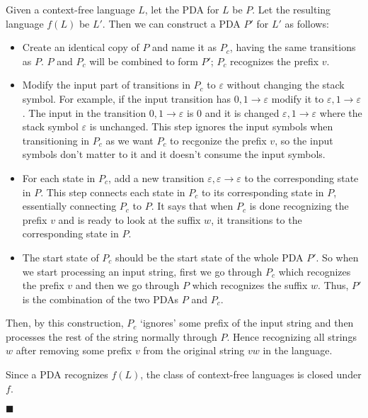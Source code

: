 \documentclass[a4paper]{exam}
\begin{document}
\begin{questions}
\begin{solution}

    Given a context-free language $L$, let the PDA for $L$ be $P$.
    Let the resulting language $f(L)$ be $L'$. Then we can construct a PDA $P'$ for $L'$ as follows: \vspace*{-2mm}
    \begin{itemize}
      \item Create an identical copy of $P$ and name it as $P_c$, having the same transitions as $P$. $P$ and $P_c$ will be combined to form $P'$; $P_c$ recognizes the prefix $v$. \vspace*{-2mm}
      \item Modify the input part of transitions in $P_c$ to $\varepsilon$ without changing the stack symbol. For example, if the input transition has $ 0, 1 \rightarrow \varepsilon $ modify it to $ \varepsilon, 1 \rightarrow \varepsilon $. The input in the transition $ 0, 1 \rightarrow \varepsilon $ is 0 and it is changed $ \varepsilon, 1 \rightarrow \varepsilon $ where the stack symbol $ \varepsilon $ is unchanged. This step ignores the input symbols when transitioning in $P_c$ as we want $P_c$ to recgonize the prefix $v$, so the input symbols don't matter to it and it doesn't consume the input symbols. \vspace*{-2mm}
      \item For each state in $P_c$, add a new transition $ \varepsilon, \varepsilon \rightarrow \varepsilon $ to the corresponding state in $P$. This step connects each state in $P_c$ to its corresponding state in $P$, essentially connecting $P_c$ to $P$. It says that when $P_c$ is done recognizing the prefix $v$ and is ready to look at the suffix $w$, it transitions to the corresponding state in $P$. \vspace*{-2mm}
      \item The start state of $P_c$ should be the start state of the whole PDA $P'$. So when we start processing an input string, first we go through $P_c$ which recognizes the prefix $v$ and then we go through $P$ which recognizes the suffix $w$. Thus, $P'$ is the combination of the two PDAs $P$ and $P_c$.
    \end{itemize}
    Then, by this construction, $P_c$ `ignores' some prefix of the input string and then processes the rest of the string normally through $P$. Hence recognizing all strings $w$ after removing some prefix $v$ from the original string $vw$ in the language.

    Since a PDA recognizes $f(L)$, the class of context-free languages is closed under $f$. 
    \begin{flushright}
      $\blacksquare$
    \end{flushright}

  \end{solution}

\end{questions}
\end{document}
